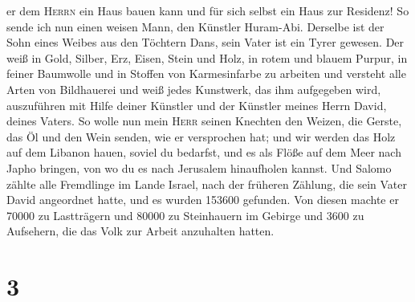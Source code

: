er dem \textsc{Herrn} ein Haus bauen kann und für sich selbst ein Haus
zur Residenz!  So sende ich nun einen weisen Mann, den
Künstler Huram-Abi.  Derselbe ist der Sohn eines Weibes
aus den Töchtern Dans, sein Vater ist ein Tyrer gewesen. Der weiß in
Gold, Silber, Erz, Eisen, Stein und Holz, in rotem und blauem Purpur, in
feiner Baumwolle und in Stoffen von Karmesinfarbe zu arbeiten und
versteht alle Arten von Bildhauerei und weiß jedes Kunstwerk, das ihm
aufgegeben wird, auszuführen mit Hilfe deiner Künstler und der Künstler
meines Herrn David, deines Vaters.  So wolle nun mein
\textsc{Herr} seinen Knechten den Weizen, die Gerste, das Öl und den
Wein senden, wie er versprochen hat;  und wir werden das
Holz auf dem Libanon hauen, soviel du bedarfst, und es als Flöße auf dem
Meer nach Japho bringen, von wo du es nach Jerusalem hinaufholen kannst.
 Und Salomo zählte alle Fremdlinge im Lande Israel, nach
der früheren Zählung, die sein Vater David angeordnet hatte, und es
wurden 153600 gefunden.  Von diesen machte er 70000 zu
Lastträgern und 80000 zu Steinhauern im Gebirge und 3600 zu Aufsehern,
die das Volk zur Arbeit anzuhalten hatten.

\hypertarget{section-2}{%
\section{3}\label{section-2}}


